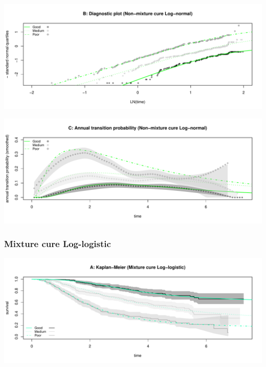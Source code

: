 \documentclass[
]{article}
\begin{document}
\begin{flushleft}\includegraphics[height=0.25\textheight]{BC_OS_output/Images/Figure_cure_models-11} \end{flushleft}

\begin{flushleft}\includegraphics[height=0.25\textheight]{BC_OS_output/Images/Figure_cure_models-12} \end{flushleft}

\clearpage

\subsubsection{Mixture cure
Log-logistic}\label{mixture-cure-log-logistic}

\begin{flushleft}\includegraphics[height=0.25\textheight]{BC_OS_output/Images/Figure_cure_models-13} \end{flushleft}
\end{document}
